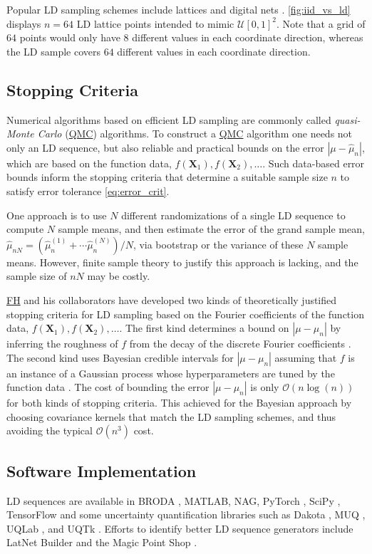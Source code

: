 \documentclass[11pt]{NSFamsart}
\newcommand{\FH}{\hyperlink{FHlink}{FH}\xspace}
\newcommand{\QMC}{\hyperlink{QMClink}{QMC}\xspace}
\newcommand{\NAG}{NAG\xspace}
\newcommand{\MATLAB}{MATLAB\xspace}
\newcommand{\bX}{{\boldsymbol{X}}}
\newcommand{\calu}{{\mathcal{U}}}
\def\abs#1{\ensuremath{\left \lvert #1 \right \rvert}}
\newcommand{\Order}{\mathcal{O}}
\newcommand{\hmu}{\hat{\mu}}
\begin{document}
Popular LD sampling schemes include lattices \cite{Nie92,SloJoe94,DicEtal22a} and digital nets \cite{Nie92,DicPil10a}. \cref{fig:iid_vs_ld} displays $n=64$ LD lattice points intended to mimic $\calu[0,1]^2$.  Note that a grid of $64$ points would only have $8$ different values in each coordinate direction, whereas  the LD sample covers $64$ different values in each coordinate direction.

\subsection{Stopping Criteria} \label{sec:stopcrit}
Numerical algorithms based on efficient LD sampling are commonly called \hypertarget{QMClink}{\emph{quasi-Monte Carlo}} (\QMC) algorithms. To construct a \QMC algorithm one  needs not only an LD sequence, but also reliable and practical bounds on the error $\abs{\mu - \hmu_n}$, which are    based on the function data, $f(\bX_1), f(\bX_2), \ldots$.  Such data-based error bounds inform the stopping criteria that determine a suitable sample size $n$  to satisfy  error tolerance \eqref{eq:error_crit}.

One approach is to use $N$ different randomizations of a single LD sequence to compute $N$ sample means, and then estimate the error of the grand sample mean, $\hmu_{nN} = (\hmu_n^{(1)} +  \cdots \hmu_n^{(N)})/N$, via bootstrap or the variance of these $N$ sample means.  However, finite sample theory to justify this approach is lacking, and the sample size of $nN$ may be costly.

\FH and his collaborators have developed two kinds of theoretically justified stopping criteria for LD sampling based on the Fourier coefficients of the function data, $f(\bX_1), f(\bX_2), \ldots$.  The first kind determines a bound on $\abs{\mu-\mu_n}$ by inferring the roughness of $f$ from the decay of the discrete Fourier coefficients \cite{HicJim16a,JimHic16a,HicEtal17a}.  The second kind uses  Bayesian credible intervals for $\abs{\mu-\mu_n}$ assuming that $f$ is an instance of a Gaussian process whose hyperparameters are tuned by the function data \cite{HicJag18b,RatHic19a,JagHic22a}. The cost of bounding the error $\abs{\mu-\mu_n}$ is only $\Order(n \log(n))$ for both kinds of stopping criteria.  This achieved for the Bayesian approach by choosing covariance kernels that match the LD sampling schemes, and thus avoiding the typical $\Order(n^3)$ cost.

\subsection{Software Implementation} \label{sec:software}
LD sequences are available in BRODA \cite{BRODA20a}, \MATLAB \cite{MAT9.9}, \NAG \cite{NAG27}, PyTorch \cite{paszke2019pytorch}, SciPy \cite{virtanen2020scipy}, TensorFlow \cite{tfqf2021a} and some uncertainty quantification libraries such as Dakota \cite{DakotaUsersManual}, MUQ \cite{MUQ}, UQLab \cite{UQLab2014}, and UQTk \cite{DebEtal04,UQTk}.  Efforts to identify better LD sequence generators include LatNet Builder \cite{LatNet} and the Magic Point Shop \cite{Nuy17a}.  
\end{document}
